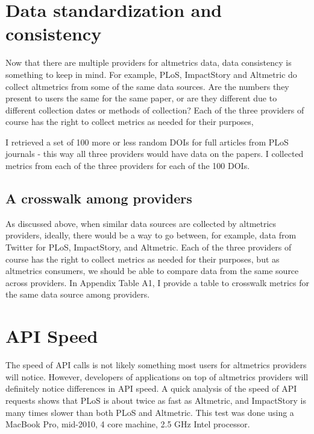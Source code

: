 \documentclass[letterpaper,superscriptaddress,showkeys,longbibliography]{revtex4-1}\usepackage{graphicx, color}
\begin{document}
\section{Data standardization and consistency}

Now that there are multiple providers for altmetrics data, data consistency is something to keep in mind. For example, PLoS, ImpactStory and Altmetric do collect altmetrics from some of the same data sources. Are the numbers they present to users the same for the same paper, or are they different due to different collection dates or methods of collection? Each of the three providers of course has the right to collect metrics as needed for their purposes, 

I retrieved a set of 100 more or less random DOIs for full articles from PLoS journals - this way all three providers would have data on the papers. I collected metrics from each of the three providers for each of the 100 DOIs. 




\subsection*{A crosswalk among providers}

As discussed above, when similar data sources are collected by altmetrics providers, ideally, there would be a way to go between, for example, data from Twitter for PLoS, ImpactStory, and Altmetric. Each of the three providers of course has the right to collect metrics as needed for their purposes, but as altmetrics consumers, we should be able to compare data from the same source across providers. In Appendix Table A1, I provide a table to crosswalk metrics for the same data source among providers.

\section{API Speed}

The speed of API calls is not likely something most users for altmetrics providers will notice. However, developers of applications on top of altmetrics providers will definitely notice differences in API speed. A quick analysis of the speed of API requests shows that PLoS is about twice as fast as Altmetric, and ImpactStory is many times slower than both PLoS and Altmetric. This test was done using a MacBook Pro, mid-2010, 4 core machine, 2.5 GHz Intel processor. 
\end{document}

